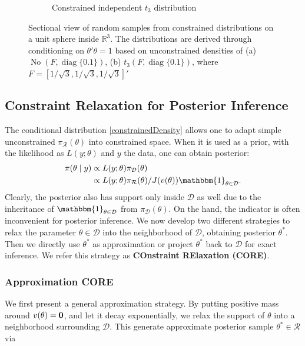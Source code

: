 \documentclass[10pt,fleqn]{article}
\newcommand{\be}{\begin{equation}\begin{aligned}}
\newcommand{\ee}{\end{aligned}\end{equation}}
\newcommand{\bb}[1]{\mathbb{#1}}
\newcommand{\mc}[1]{\mathcal{#1}}
\DeclareMathOperator{\No}{No}
\DeclareMathOperator{\diag}{diag}
\DeclareMathOperator{\1}{\mathbbm{1}}
\begin{document}
\begin{figure}[H]
\begin{subfigure}[b]{0.45\textwidth}
\caption{Constrained independent $t_3$ distribution}
\end{subfigure}
\caption{Sectional view of random samples from constrained distributions on a unit sphere inside $\bb R^3$. The distributions are derived through conditioning on $\theta'\theta=1$ based on unconstrained densities of (a) $\No( F, \diag\{0.1\})$, 
 (b) $t_3(F,\diag\{0.1\} )$, where $F=[1/\sqrt{3},1/\sqrt{3},1/\sqrt{3}]'$\\
}
\label{sphere_examples}
\end{figure}



\subsection{ Constraint Relaxation for Posterior Inference}

The conditional distribution \eqref{constrainedDensity} allows one to adapt
simple unconstrained $\pi_{\mc R}(\theta)$ into constrained space. When it
is used as a prior,
with  the likelihood as $ L(y;\theta)$  and $y$ the data, one can obtain posterior:
\be
\label{exactPosterior}
\pi(\theta\mid y) & \propto L(y;\theta)\pi_{\mc D}(\theta) \\
& \propto L(y;\theta) \pi_{\mc
R}(\theta) /J(v(\theta))\mathbbm{1}_{\theta\in \mc D}.
\ee
Clearly, the
posterior also has support only inside $\mc D$ as well due to the inheritance of
$\mathbbm{1}_{\theta\in \mc D}$ from $\pi_{\mc D}(\theta)$. On the hand,
the indicator is often inconvenient for posterior inference. We now develop
 two different strategies to relax the parameter $\theta\in \mc D$ into the neighborhood
of $\mc D$, obtaining posterior $\theta^*$. Then we directly use $\theta^*$ as approximation
or project $\theta^*$ back to $\mc D$ for exact inference. We refer this
strategy as {\bf COnstraint RElaxation (CORE)}.


 \subsubsection{Approximation CORE}

We first present a general approximation strategy. By putting positive mass around $v(\theta)=\bf
0$, and let it decay exponentially, we relax the support of $\theta$ into a
neighborhood surrounding $\mc D $. This generate approximate posterior sample $\theta^*\in \mc R$ via
\end{document}

